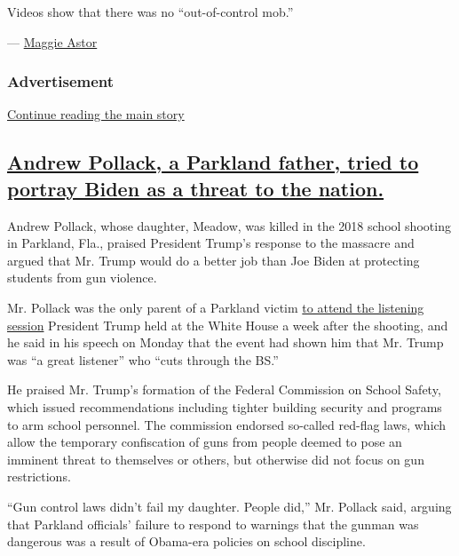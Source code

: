 Videos show that there was no ``out-of-control mob.''

--- \href{https://www.nytimes3xbfgragh.onion/by/maggie-astor}{Maggie
Astor}

\hypertarget{advertisement-3}{%
\subsubsection{Advertisement}\label{advertisement-3}}

\protect\hyperlink{after-dfp-ad-mid4}{Continue reading the main story}

\hypertarget{andrew-pollack-a-parkland-father-tried-to-portray-biden-as-a-threat-to-the-nation}{%
\subsection{\texorpdfstring{\protect\hyperlink{andrew-pollack-a-parkland-father-tried-to-portray-biden-as-a-threat-to-the-nation}{Andrew
Pollack, a Parkland father, tried to portray Biden as a threat to the
nation.}}{Andrew Pollack, a Parkland father, tried to portray Biden as a threat to the nation.}}\label{andrew-pollack-a-parkland-father-tried-to-portray-biden-as-a-threat-to-the-nation}}

Andrew Pollack, whose daughter, Meadow, was killed in the 2018 school
shooting in Parkland, Fla., praised President Trump's response to the
massacre and argued that Mr. Trump would do a better job than Joe Biden
at protecting students from gun violence.

Mr. Pollack was the only parent of a Parkland victim
\href{https://www.nytimes3xbfgragh.onion/2018/02/21/us/politics/trump-guns-school-shooting.html}{to
attend the listening session} President Trump held at the White House a
week after the shooting, and he said in his speech on Monday that the
event had shown him that Mr. Trump was ``a great listener'' who ``cuts
through the BS.''

He praised Mr. Trump's formation of the Federal Commission on School
Safety, which issued recommendations including tighter building security
and programs to arm school personnel. The commission endorsed so-called
red-flag laws, which allow the temporary confiscation of guns from
people deemed to pose an imminent threat to themselves or others, but
otherwise did not focus on gun restrictions.

``Gun control laws didn't fail my daughter. People did,'' Mr. Pollack
said, arguing that Parkland officials' failure to respond to warnings
that the gunman was dangerous was a result of Obama-era policies on
school discipline.

